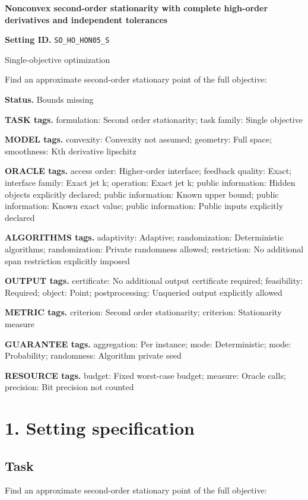 \documentclass[10pt,a4paper]{article}
\begin{document}
\raggedright

{\LARGE\bfseries\sffamily\color{AtlasNavy} Nonconvex second-order stationarity with complete high-order derivatives and independent tolerances\par}\vspace{5pt}
\textbf{Setting ID.} \texttt{SO\_\allowbreak{}\allowbreak{}HO\_\allowbreak{}\allowbreak{}HON05\_\allowbreak{}\allowbreak{}S}

Single-objective optimization

Find an approximate second-order stationary point of the full objective:

\textbf{Status.} Bounds missing

\textbf{TASK tags.} formulation: Second order stationarity; task family: Single objective

\textbf{MODEL tags.} convexity: Convexity not assumed; geometry: Full space; smoothness: Kth derivative lipschitz

\textbf{ORACLE tags.} access order: Higher-order interface; feedback quality: Exact; interface family: Exact jet k; operation: Exact jet k; public information: Hidden objects explicitly declared; public information: Known upper bound; public information: Known exact value; public information: Public inputs explicitly declared

\textbf{ALGORITHMS tags.} adaptivity: Adaptive; randomization: Deterministic algorithms; randomization: Private randomness allowed; restriction: No additional span restriction explicitly imposed

\textbf{OUTPUT tags.} certificate: No additional output certificate required; feasibility: Required; object: Point; postprocessing: Unqueried output explicitly allowed

\textbf{METRIC tags.} criterion: Second order stationarity; criterion: Stationarity measure

\textbf{GUARANTEE tags.} aggregation: Per instance; mode: Deterministic; mode: Probability; randomness: Algorithm private seed

\textbf{RESOURCE tags.} budget: Fixed worst-case budget; measure: Oracle calls; precision: Bit precision not counted

\section{1. Setting specification}
\subsection{Task}
Find an approximate second-order stationary point of the full objective:
\end{document}
